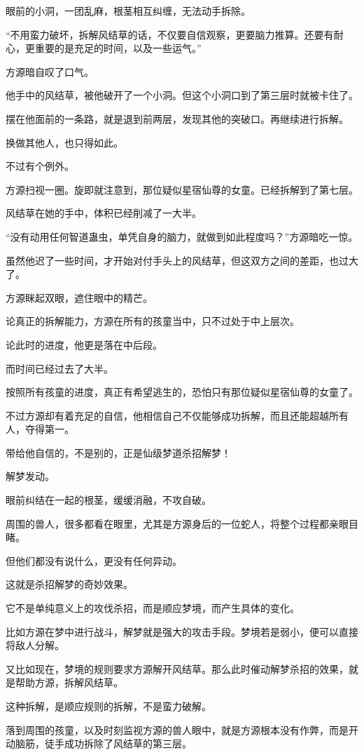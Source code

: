\begin{this_body}
眼前的小洞，一团乱麻，根茎相互纠缠，无法动手拆除。

“不用蛮力破坏，拆解风结草的话，不仅要自信观察，更要脑力推算。还要有耐心，更重要的是充足的时间，以及一些运气。”

方源暗自叹了口气。

他手中的风结草，被他破开了一个小洞。但这个小洞口到了第三层时就被卡住了。

摆在他面前的一条路，就是退到前两层，发现其他的突破口。再继续进行拆解。

换做其他人，也只得如此。

不过有个例外。

方源扫视一圈。旋即就注意到，那位疑似星宿仙尊的女童。已经拆解到了第七层。

风结草在她的手中，体积已经削减了一大半。

“没有动用任何智道蛊虫，单凭自身的脑力，就做到如此程度吗？”方源暗吃一惊。

虽然他迟了一些时间，才开始对付手头上的风结草，但这双方之间的差距，也过大了。

方源眯起双眼，遮住眼中的精芒。

论真正的拆解能力，方源在所有的孩童当中，只不过处于中上层次。

论此时的进度，他更是落在中后段。

而时间已经过去了大半。

按照所有孩童的进度，真正有希望逃生的，恐怕只有那位疑似星宿仙尊的女童了。

不过方源却有着充足的自信，他相信自己不仅能够成功拆解，而且还能超越所有人，夺得第一。

带给他自信的，不是别的，正是仙级梦道杀招解梦！

解梦发动。

眼前纠结在一起的根茎，缓缓消融，不攻自破。

周围的兽人，很多都看在眼里，尤其是方源身后的一位蛇人，将整个过程都亲眼目睹。

但他们都没有说什么，更没有任何异动。

这就是杀招解梦的奇妙效果。

它不是单纯意义上的攻伐杀招，而是顺应梦境，而产生具体的变化。

比如方源在梦中进行战斗，解梦就是强大的攻击手段。梦境若是弱小，便可以直接将敌人分解。

又比如现在，梦境的规则要求方源解开风结草。那么此时催动解梦杀招的效果，就是帮助方源，拆解风结草。

这种拆解，是顺应规则的拆解，不是蛮力破解。

落到周围的孩童，以及时刻监视方源的兽人眼中，就是方源根本没有作弊，而是开动脑筋，徒手成功拆除了风结草的第三层。


\end{this_body}
